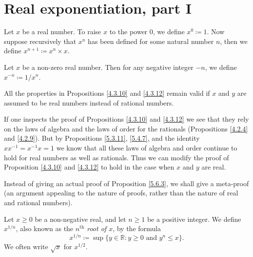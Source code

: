 \section{Real exponentiation, part I}\label{sec 5.6}

\begin{definition}\label{5.6.1}
Let \(x\) be a real number.
To raise \(x\) to the power \(0\), we define \(x^0 \coloneqq 1\).
Now suppose recursively that \(x^n\) has been defined for some natural number \(n\), then we define \(x^{n + 1} \coloneqq x^n \times x\).
\end{definition}

\begin{definition}\label{5.6.2}
Let \(x\) be a non-zero real number.
Then for any negative integer \(-n\), we define \(x^{-n} \coloneqq 1 / x^n\).
\end{definition}

\begin{proposition}\label{5.6.3}
All the properties in Propositions \ref{4.3.10} and \ref{4.3.12} remain valid if \(x\) and \(y\) are assumed to be real numbers instead of rational numbers.
\end{proposition}

\begin{meta-proof}
If one inspects the proof of Propositions \ref{4.3.10} and \ref{4.3.12} we see that they rely on the laws of algebra and the laws of order for the rationals (Propositions \ref{4.2.4} and \ref{4.2.9}).
But by Propositions \ref{5.3.11}, \ref{5.4.7}, and the identity \(xx^{-1} = x^{-1} x = 1\) we know that all these laws of algebra and order continue to hold for real numbers as well as rationals.
Thus we can modify the proof of Proposition \ref{4.3.10} and \ref{4.3.12} to hold in the case when \(x\) and \(y\) are real.
\end{meta-proof}

\begin{note}
Instead of giving an actual proof of Proposition \ref{5.6.3}, we shall give a meta-proof
(an argument appealing to the nature of proofs, rather than the nature of real and rational numbers).
\end{note}

\begin{definition}\label{5.6.4}
Let \(x \geq 0\) be a non-negative real, and let \(n \geq 1\) be a positive integer.
We define \(x^{1 / n}\), also known as the \emph{\(n^{\text{th}}\) root of \(x\)}, by the formula
\[
    x^{1 / n} \coloneqq \sup\{y \in \mathds{R} : y \geq 0 \text{ and } y^n \leq x\}.
\]
We often write \(\sqrt{x}\) for \(x^{1 / 2}\).
\end{definition}

